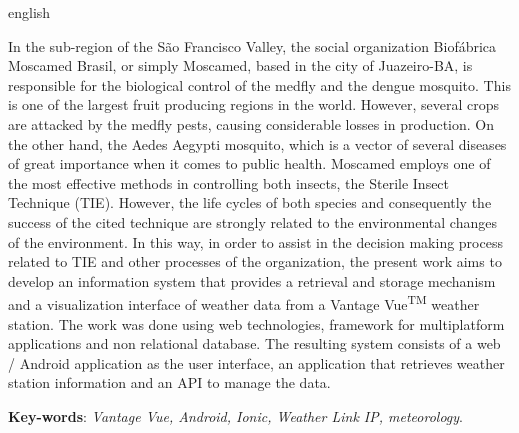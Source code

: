 \begin{resumo}[Abstract]
\begin{otherlanguage*}{english}

	In the sub-region of the São Francisco Valley, the social organization Biofábrica Moscamed Brasil, or simply Moscamed, based in the city of Juazeiro-BA, is responsible for the biological control of the medfly and the dengue mosquito. This is one of the largest fruit producing regions in the world. However, several crops are attacked by the medfly pests, causing considerable losses in production. On the other hand, the Aedes Aegypti mosquito, which is a vector of several diseases of great importance when it comes to public health. Moscamed employs one of the most effective methods in controlling both insects, the Sterile Insect Technique (TIE). However, the life cycles of both species and consequently the success of the cited technique are strongly related to the environmental changes of the environment. In this way, in order to assist in the decision making process related to TIE and other processes of the organization, the present work aims to develop an information system that provides a retrieval and storage mechanism and a visualization interface of weather data from a Vantage Vue\textsuperscript{TM} weather station. The work was done using web technologies, framework for multiplatform applications and non relational database. The resulting system consists of a web / Android application as the user interface, an application that retrieves weather station information and an API to manage the data.
	
	\vspace{\onelineskip}

	\noindent
	\textbf{Key-words}: \textit{Vantage Vue, Android, Ionic, Weather Link IP, meteorology}.

 \end{otherlanguage*}
\end{resumo}


